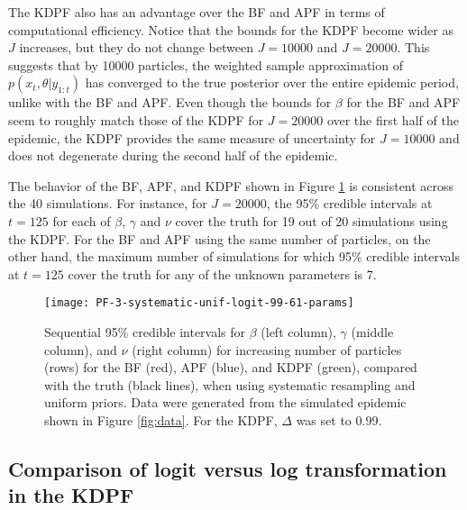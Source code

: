 \documentclass{elsarticle}
\begin{document}
The KDPF also has an advantage over the BF and APF in terms of computational efficiency. Notice that the bounds for the KDPF become wider as $J$ increases, but they do not change between $J = 10000$ and $J = 20000$. This suggests that by 10000 particles, the weighted sample approximation of $p(x_t,\theta|y_{1:t})$ has converged to the true posterior over the entire epidemic period, unlike with the BF and APF. Even though the bounds for $\beta$ for the BF and APF seem to roughly match those of the KDPF for $J = 20000$ over the first half of the epidemic, the KDPF provides the same measure of uncertainty for $J = 10000$ and does not degenerate during the second half of the epidemic.

The behavior of the BF, APF, and KDPF shown in Figure \ref{fig:pfs} is consistent across the 40 simulations. For instance, for $J = 20000$, the 95\% credible intervals at $t = 125$ for each of $\beta$, $\gamma$ and $\nu$ cover the truth for 19 out of 20 simulations using the KDPF. For the BF and APF using the same number of particles, on the other hand, the maximum number of simulations for which 95\% credible intervals at $t = 125$ cover the truth for any of the unknown parameters is 7.


\begin{figure}
\centering
\texttt{[image: PF-3-systematic-unif-logit-99-61-params]}
\caption{Sequential 95\% credible intervals for $\beta$ (left column), $\gamma$ (middle column), and $\nu$ (right column) for increasing number of particles (rows) for the BF (red), APF (blue), and KDPF (green), compared with the truth (black lines), when using systematic resampling and uniform priors. Data were generated from the simulated epidemic shown in Figure \ref{fig:data}. For the KDPF, $\Delta$ was set to 0.99. } \label{fig:pfs}
\end{figure}

\subsection{Comparison of logit versus log transformation in the KDPF \label{sec:priors}}
\end{document}

